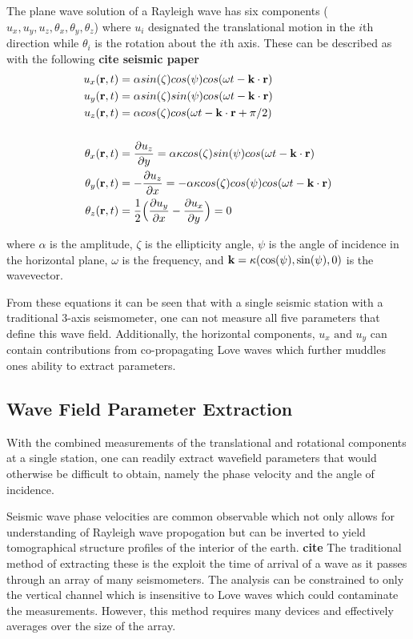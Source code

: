 \documentclass [12pt, proquest]{uwthesis}[2019]
\begin{document}
The plane wave solution of a Rayleigh wave has six components ($u_x, u_y, u_z, \theta_x, \theta_y, \theta_z$) where $u_i$ designated the translational motion in the $i$th direction while $\theta_i$ is the rotation about the $i$th axis.
These can be described as with the following \textbf{cite seismic paper}
\begin{align}
u_x({\bf r} ,t)&=\alpha sin(\zeta) cos(\psi) cos(\omega t-{\bf k}\cdot{\bf r})\\
u_y({\bf r} ,t)&=\alpha sin(\zeta) sin(\psi) cos(\omega t-{\bf k}\cdot{\bf r})\\
u_z({\bf r} ,t)&=\alpha cos(\zeta) cos(\omega t-{\bf k}\cdot{\bf r}+\pi/2)\label{ZEq}\\
\notag \\
\theta_x({\bf r} ,t)&=\frac{\partial u_z}{\partial y}=\alpha \kappa cos(\zeta) sin(\psi) cos(\omega t-{\bf k}\cdot{\bf r})\label{TiltXEq}\\
\theta_y({\bf r} ,t)&=-\frac{\partial u_z}{\partial x}=-\alpha \kappa cos(\zeta) cos(\psi) cos(\omega t-{\bf k}\cdot{\bf r})\\
\theta_z({\bf r} ,t)&=\frac{1}{2}\Big(\frac{\partial u_y}{\partial x}-\frac{\partial u_x}{\partial y}\Big)=0
\end{align}

where $\alpha$ is the amplitude, $\zeta$ is the ellipticity angle, $\psi$ is the angle of incidence in the horizontal plane, $\omega$ is the frequency, and $\bf{k}=\kappa (\text{cos}(\psi),\text{sin}(\psi),\text{0})$ is the wavevector.

From these equations it can be seen that with a single seismic station with a traditional 3-axis seismometer, one can not measure all five parameters that define this wave field. Additionally, the horizontal components, $u_x\text{ and }u_y$ can contain contributions from co-propagating Love waves which further muddles ones ability to extract parameters. 

\subsection{Wave Field Parameter Extraction}

With the combined measurements of the translational and rotational components at a single station, one can readily extract wavefield parameters that would otherwise be difficult to obtain, namely the phase velocity and the angle of incidence. 

Seismic wave phase velocities are common observable which not only allows for understanding of Rayleigh wave propogation but can be inverted to yield tomographical structure profiles of the interior of the earth. \textbf{cite} The traditional method of extracting these is the exploit the time of arrival of a wave as it passes through an array of many seismometers. The analysis can be constrained to only the vertical channel which is insensitive to Love waves which could contaminate the measurements. However, this method requires many devices and effectively averages over the size of the array.
\end{document}
